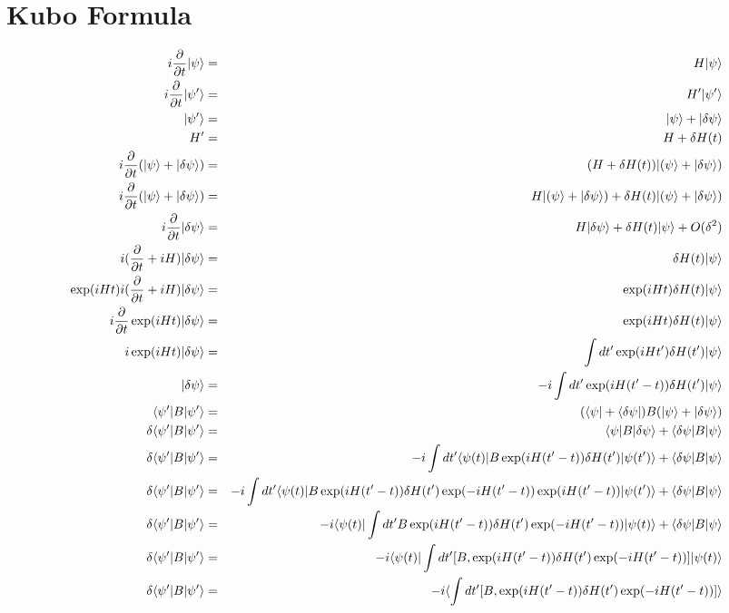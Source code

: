 \documentclass[12pt]{article}
\begin{document}
\section{Kubo Formula}
\begin{eqnarray}i{\partial\over\partial t}|\psi\rangle &=& H|\psi\rangle\\
i{\partial\over\partial t}|\psi'\rangle &=& H'|\psi'\rangle\\
|\psi'\rangle &=&|\psi\rangle+|\delta\psi\rangle\\
H' &=&H+\delta H(t)\\
i{\partial\over\partial t}(|\psi\rangle+|\delta\psi\rangle) &=& (H+\delta H(t))|(\psi\rangle+|\delta\psi\rangle)\\
i{\partial\over\partial t}(|\psi\rangle+|\delta\psi\rangle) &=& H|(\psi\rangle+|\delta\psi\rangle)+\delta H(t)|(\psi\rangle+|\delta\psi\rangle)\\
i{\partial\over\partial t}|\delta\psi\rangle &=& H|\delta\psi\rangle+\delta H(t)|\psi\rangle+O(\delta^2)\\
i({\partial\over\partial t}+iH)|\delta\psi\rangle &=& \delta H(t)|\psi\rangle\\
\exp(iHt)i({\partial\over\partial t}+iH)|\delta\psi\rangle &=& \exp(iHt)\delta H(t)|\psi\rangle\\
i{\partial\over\partial t}\exp(iHt)|\delta\psi\rangle &=& \exp(iHt)\delta H(t)|\psi\rangle\\
i\exp(iHt)|\delta\psi\rangle &=& \int dt'\exp(iHt')\delta H(t')|\psi\rangle\\
|\delta\psi\rangle &=& -i\int dt'\exp(iH(t'-t))\delta H(t')|\psi\rangle\\
\langle\psi'|B|\psi'\rangle &=& (\langle\psi|+\langle\delta\psi|)B(|\psi\rangle+|\delta\psi\rangle)\\
\delta \langle\psi'|B|\psi'\rangle &=& \langle\psi|B|\delta\psi\rangle+\langle\delta\psi|B|\psi\rangle\\
\delta\langle\psi'|B|\psi'\rangle &=& -i\int dt'\langle\psi(t)|B\exp(iH(t'-t))\delta H(t')|\psi(t')\rangle+\langle\delta\psi|B|\psi\rangle\\
\delta\langle\psi'|B|\psi'\rangle &=& -i\int dt'\langle\psi(t)|B\exp(iH(t'-t))\delta H(t')\exp(-iH(t'-t))\exp(iH(t'-t))|\psi(t')\rangle+\langle\delta\psi|B|\psi\rangle\\
\delta\langle\psi'|B|\psi'\rangle &=& -i\langle\psi(t)|\int dt'B\exp(iH(t'-t))\delta H(t')\exp(-iH(t'-t))|\psi(t)\rangle+\langle\delta\psi|B|\psi\rangle\\
\delta\langle\psi'|B|\psi'\rangle &=& -i\langle\psi(t)|\int dt'[B,\exp(iH(t'-t))\delta H(t')\exp(-iH(t'-t))]|\psi(t)\rangle\\
\delta\langle\psi'|B|\psi'\rangle &=& -i\langle\int dt'[B,\exp(iH(t'-t))\delta H(t')\exp(-iH(t'-t))]\rangle\\
\end{eqnarray}
\end{document}

